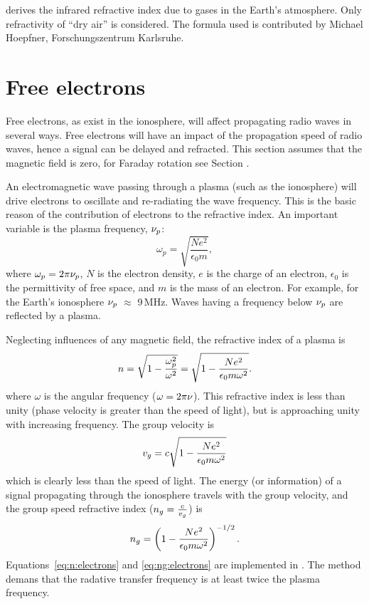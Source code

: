  derives the infrared refractive index due to gases in the Earth's atmosphere. Only refractivity of ``dry air'' is considered. The formula used is contributed by Michael Hoepfner, Forschungszentrum Karlsruhe.


\section{Free electrons}
 \label{sec:rindex:freee}
%
Free electrons, as exist in the ionosphere, will affect propagating radio waves
in several ways. Free electrons will have an impact of the propagation speed of
radio waves, hence a signal can be delayed and refracted. This section assumes
that the magnetic field is zero, for Faraday rotation see Section .

An electromagnetic wave passing through a plasma (such as the ionosphere) will
drive electrons to oscillate and re-radiating the wave frequency. This is the
basic reason of the contribution of electrons to the refractive index. 
An important variable is the plasma frequency, $\nu_{p}$:
\begin{equation}
  \omega_{p}=\sqrt{\frac{Ne^{2}}{\epsilon_{0}m}},
\end{equation}
where \(\omega_{p}=2\pi\nu_{p}\), \(N\) is the electron density, \(e\) is the
charge of an electron, \(\epsilon_{0}\) is the permittivity of free space, and
\(m\) is the mass of an electron. For example, for the Earth's ionosphere
\(\nu_{p}\) \(\approx\) 9\,MHz.
Waves having a frequency below $\nu_{p}$ are reflected by a plasma.

Neglecting influences of any magnetic field, the refractive index of a plasma
is \citep[e.g.][]{rybicki:radia:79}
\begin{equation}
\label{eq:n:electrons}
n =\sqrt{1-\frac{\omega_{p}^{2}}{\omega^{2}}}=\sqrt{1-\frac{Ne^{2}}
{\epsilon_{0}m\omega^{2}}}.
\end{equation}
where $\omega$ is the angular frequency ($\omega=2\pi\nu$). This refractive
index is less than unity (phase velocity is greater than the speed of light),
but is approaching unity with increasing frequency. The group velocity is
\citep{rybicki:radia:79}
\begin{equation}
v_{g}=c\sqrt{1-\frac{Ne^{2}}
{\epsilon_{0}m\omega^{2}}}
\end{equation}
which is clearly less than the speed of light.
The energy (or information) of a signal propagating through the ionosphere
travels with the group velocity, and the group speed refractive
index (\(n_{g}=\frac{c}{v_{g}}\)) is
\begin{equation}
\label{eq:ng:electrons}
  n_{g}=\left(
    1-\frac{Ne^{2}}
    {\epsilon_{0}m\omega^{2}}
  \right)^{-1/2}.
\end{equation}
Equations~\ref{eq:n:electrons} and \ref{eq:ng:electrons} are implemented in
. The method demans that the radative
transfer frequency is at least twice the plasma frequency.


